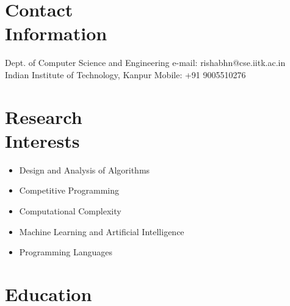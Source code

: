 \documentclass[margin,line]{resume}
\begin{document}
\begin{resume}

    \section{\mysidestyle Contact\\Information}

    Dept. of Computer Science and Engineering                            \hfill e-mail: rishabhn@cse.iitk.ac.in  \vspace{0mm}\\\vspace{0mm}%
    Indian Institute of Technology, Kanpur                         \hfill Mobile: +91 9005510276 \vspace{0mm}\       \vspace{0mm}\\\vspace{-4.5mm}%


    \section{\mysidestyle Research\\Interests}

    \begin{itemize}\itemsep0pt
\item Design and Analysis of Algorithms
\item Competitive Programming
\item Computational Complexity
\item Machine Learning and Artificial Intelligence
\item Programming Languages

\end{itemize}


    \section{\mysidestyle Education}


\end{resume}
\end{document}
